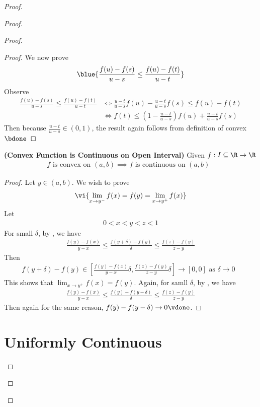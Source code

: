 \documentclass{report}
\begin{document}
\begin{proof}
\begin{proof}
\begin{proof}
\begin{proof}
We now prove 
\begin{align*}
\blue{\frac{f(u)-f(s)}{u-s}\leq \frac{f(u)-f(t)}{u-t}}
\end{align*}
Observe 
\begin{align*}
  \frac{f(u)-f(s)}{u-s}\leq \frac{f(u)-f(t)}{u-t}&\iff \frac{u-t}{u-s}f(u)-\frac{u-t}{u-s}f(s)\leq f(u)-f(t)\\
  &\iff f(t)\leq (1-\frac{u-t}{u-s})f(u)+\frac{u-t}{u-s}f(s)
\end{align*}
Then because $\frac{u-t}{u-s}\in (0,1)$, the result again follows from definition of convex $\bdone$
\end{proof}
\begin{theorem}
\label{5.2.9}
\textbf{(Convex Function is Continuous on Open Interval)} Given $f:I\subseteq \R\rightarrow \R$
\begin{align*}
f\text{ is convex on $(a,b)$}\implies f\text{ is continuous on $(a,b)$ }
\end{align*}
\end{theorem}
\begin{proof}
Let $y\in (a,b)$. We wish to prove 
\begin{align*}
\vi{\lim_{x\to y^-}f(x)=f(y)=\lim_{x\to y^+}f(x)}
\end{align*}
Let 
\begin{align*}
0<x<y<z<1
\end{align*}
For small $\delta$, by , we have 
\begin{align*}
\frac{f(y)-f(x)}{y-x}\leq \frac{f(y+\delta)-f(y)}{\delta}\leq \frac{f(z)-f(y)}{z-y}
\end{align*}
Then 
\begin{align*}
f(y+\delta)-f(y)\in [\frac{f(y)-f(x)}{y-x}\delta,\frac{f(z)-f(y)}{z-y}\delta]\to [0,0]\text{ as $\delta \to 0$ }
\end{align*}
This shows that $\lim_{x\to y^+}f(x)=f(y)$. Again, for samll $\delta$, by , we have 
\begin{align*}
\frac{f(y)-f(x)}{y-x} \leq \frac{f(y)-f(y-\delta)}{\delta} \leq \frac{f(z)-f(y)}{z-y}
\end{align*}
Then again for the same reason, $f(y)-f(y-\delta)\to 0\vdone$.
\end{proof}
\section{Uniformly Continuous}


\end{proof}
\end{proof}
\end{proof}
\end{document}
